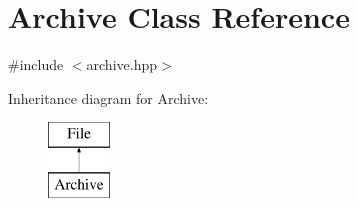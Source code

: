 \hypertarget{class_archive}{\section{Archive Class Reference}
\label{class_archive}
}


{\ttfamily \#include $<$archive.\-hpp$>$}

Inheritance diagram for Archive\-:\begin{figure}[H]
\begin{center}
\leavevmode
\includegraphics[height=2.000000cm]{class_archive}
\end{center}
\end{figure}
